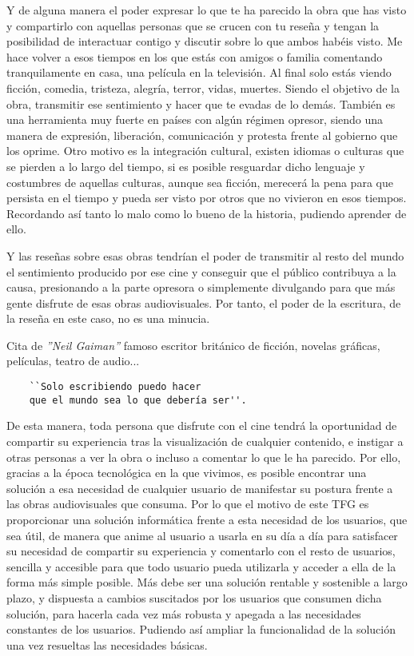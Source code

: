 Y de alguna manera el poder expresar lo que te ha parecido la obra que has visto y compartirlo con 
aquellas personas que se crucen con tu reseña y tengan la posibilidad de interactuar contigo y discutir 
sobre lo que ambos habéis visto. Me hace volver a esos tiempos en los que estás con amigos o familia 
comentando tranquilamente en casa, una película en la televisión. Al final solo estás viendo ficción, 
comedia, tristeza, alegría, terror, vidas, muertes. Siendo el objetivo de la obra, transmitir ese 
sentimiento y hacer que te evadas de lo demás. También es una herramienta muy fuerte en países con 
algún régimen opresor, siendo una manera de expresión, liberación, comunicación y protesta frente al 
gobierno que los oprime. Otro motivo es la integración cultural, existen idiomas o culturas que se 
pierden a lo largo del tiempo, si es posible resguardar dicho lenguaje y costumbres de aquellas 
culturas, aunque sea ficción, merecerá la pena para que persista en el tiempo y pueda ser visto por 
otros que no vivieron en esos tiempos. Recordando así tanto lo malo como lo bueno de la historia, 
pudiendo aprender de ello.

Y las reseñas sobre esas obras tendrían el poder de transmitir al resto del mundo el sentimiento 
producido por ese cine y conseguir que el público contribuya a la causa, presionando a la parte 
opresora o simplemente divulgando para que más gente disfrute de esas obras audiovisuales. Por tanto, 
el poder de la escritura, de la reseña en este caso, no es una minucia.


Cita de \textit{''Neil Gaiman''}\cite{NeilG} famoso escritor británico de ficción, novelas gráficas,
películas, teatro de audio...
\begin{verbatim}
    ``Solo escribiendo puedo hacer 
    que el mundo sea lo que debería ser''.
\end{verbatim}

De esta manera, toda persona que disfrute con el cine tendrá la oportunidad de compartir su experiencia 
tras la visualización de cualquier contenido, e instigar a otras personas a ver la obra o incluso a 
comentar lo que le ha parecido. Por ello, gracias a la época tecnológica en la que vivimos, es posible 
encontrar una solución a esa necesidad de cualquier usuario de manifestar su postura frente a las obras 
audiovisuales que consuma. Por lo que el motivo de este TFG es proporcionar una solución informática 
frente a esta necesidad de los usuarios, que sea útil, de manera que anime al usuario a usarla en su 
día a día para satisfacer su necesidad de compartir su experiencia y comentarlo con el resto de 
usuarios, sencilla y accesible para que todo usuario pueda utilizarla y acceder a ella de la forma más 
simple posible. Más debe ser una solución rentable y sostenible a largo plazo, y dispuesta a cambios 
suscitados por los usuarios que consumen dicha solución, para hacerla cada vez más robusta y apegada a 
las necesidades constantes de los usuarios. Pudiendo así ampliar la funcionalidad de la solución una 
vez resueltas las necesidades básicas.

